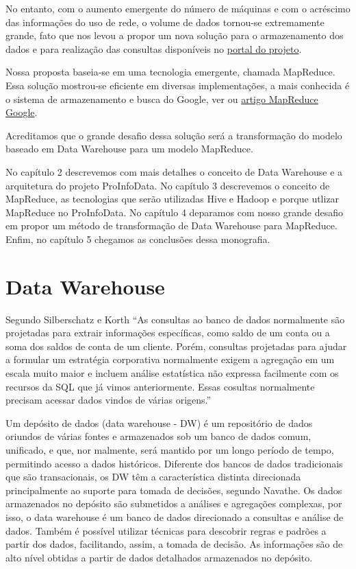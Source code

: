 \documentclass[a4paper,12pt]{article}
\begin{document}
No entanto, com o aumento emergente do número de máquinas e com o acréscimo das
informações do uso de rede, o volume de dados tornou-se extremamente grande, fato que 
nos levou a propor um nova solução para o armazenamento dos dados e para realização
das consultas disponíveis no \href {http://seed.c3sl.ufpr.br/seed/attendance/index.html}
{portal do projeto}.

Nossa proposta baseia-se em uma tecnologia emergente, chamada MapReduce. Essa solução 
mostrou-se eficiente em diversas implementações, a mais conhecida é o sistema de 
armazenamento e busca do Google, ver \cite{MapReduceGoogle} ou
\href {http://labs.google.com/papers/mapreduce.html} {artigo MapReduce Google}.

Acreditamos que o grande desafio dessa solução será a transformação do modelo baseado 
em Data Warehouse para um modelo MapReduce.

No capítulo 2 descrevemos com mais detalhes o conceito de Data Warehouse e a arquitetura
do projeto ProInfoData. No capítulo 3 descrevemos o conceito de MapReduce, as 
tecnologias que serão utilizadas Hive e Hadoop e porque utlizar MapReduce no 
ProInfoData. No capítulo 4 deparamos com nosso grande desafio em propor um método de 
transformação de Data Warehouse para MapReduce. Enfim, no capítulo 5 chegamos as
conclusões dessa monografia.

\section{\textbf{Data Warehouse}}

Segundo Silberschatz e Korth \cite{Silber}“As consultas ao banco de dados normalmente 
são projetadas para extrair informações específicas, como saldo de um conta ou a soma
dos saldos de conta de um cliente. Porém, consultas projetadas para ajudar a 
formular um estratégia corporativa normalmente exigem a agregação em um escala
muito maior e incluem análise estatística não expressa facilmente com os 
recursos da SQL que já vimos anteriormente. Essas cosultas normalmente precisam 
acessar dados vindos de várias origens.”

Um depósito de dados (data warehouse - DW) é um repositório de dados oriundos de
várias fontes e armazenados sob um banco de dados comum, unificado, e que, nor
malmente, será mantido por um longo período de tempo, permitindo acesso a dados
históricos. Diferente dos bancos de dados tradicionais que são transacionais, 
os DW têm a característica distinta direcionada principalmente ao suporte para 
tomada de decisões, segundo Navathe\cite{Navathe}. Os dados armazenados no
depósito são submetidos a análises e agregações complexas, por isso, o data 
warehouse é um banco de dados direcionado a consultas e análise de dados. Também
é possível utilizar técnicas para descobrir regras e padrões a partir dos dados,
facilitando, assim, a tomada de decisão. As informações são de alto nível
obtidas a partir de dados detalhados armazenados no depósito.
\end{document}
